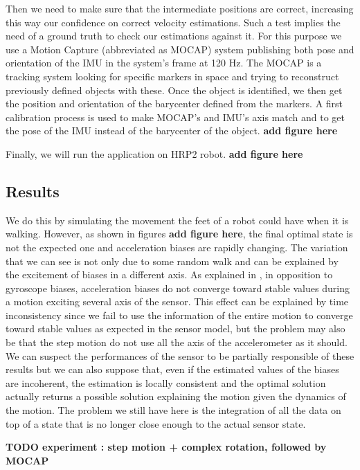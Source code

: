 Then we need to make sure that the intermediate positions are correct, increasing this way our confidence on correct velocity estimations.
Such a test implies the need of a ground truth to check our estimations against it. For this purpose we use a Motion Capture (abbreviated as MOCAP) system publishing both
pose and orientation of the IMU in the system's frame at 120 Hz. The MOCAP is a tracking system looking for specific markers in space
and trying to reconstruct previously defined objects with these. Once the object is identified, we then get the position and orientation of the barycenter defined from the markers.
A first calibration process is used to make MOCAP's and IMU's axis match and to get the pose of the IMU instead of the barycenter of the object. \textbf{add figure here}

Finally, we will run the application on HRP2 robot. \textbf{add figure here}

\subsection{Results}


We do this by simulating the movement the feet of a robot could have when it is walking. However, as shown in figures \textbf{add figure here}, the final optimal state
is not the expected one and acceleration biases are rapidly changing. The variation that we can see is not only due to some random walk and can be explained by the excitement of biases in a different axis.
As explained in \cite{roussillon2011rt}, in opposition to gyroscope biases, acceleration biases do not converge toward stable values during a motion exciting several axis of the sensor. This effect can be explained by time inconsistency since we fail
to use the information of the entire motion to converge toward stable values as expected in the sensor model, but the problem may also be that the step motion do not use all the axis of the accelerometer as it should.
We can suspect the performances of the sensor to be partially responsible of these results but we can also suppose that, even if the estimated values of the biases are incoherent, the estimation is locally consistent and the optimal solution actually
returns a possible solution explaining the motion given the dynamics of the motion. The problem we still have here is the integration of all the data on top of a state that is no longer close enough to the actual sensor state.


\textbf{TODO experiment : step motion + complex rotation, followed by MOCAP}


